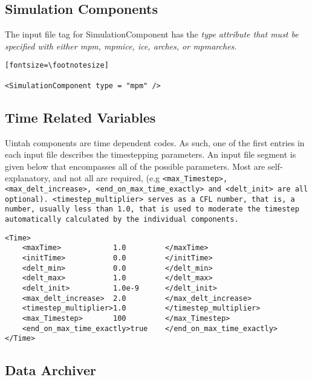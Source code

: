 \subsection{Simulation Components} \label{Sec:SimulationComponent}

The input file tag for SimulationComponent has the \em{type} attribute
that must be specified with either mpm, mpmice, ice, arches, or
mpmarches.  

\begin{verbatim}[fontsize=\footnotesize]

<SimulationComponent type = "mpm" />

\end{verbatim}



\subsection{Time Related Variables} \label{Sec:TimeRelatedVariables}
Uintah components are time dependent codes.  As such, one of the first
entries in each input file describes the timestepping parameters.  An
input file segment is given below that encompasses all of the possible
parameters.  Most are self-explanatory, and not all are required, (e.g
\tt <max\_Timestep>, <max\_delt\_increase>,
<end\_on\_max\_time\_exactly> \normalfont and \tt <delt\_init>
\normalfont are all optional).  \tt <timestep\_multiplier> \normalfont
serves as a CFL number, that is, a number, usually less than 1.0, that
is used to moderate the timestep automatically calculated by the
individual components.

\begin{Verbatim}[fontsize=\footnotesize]
<Time>
    <maxTime>            1.0         </maxTime>
    <initTime>           0.0         </initTime>
    <delt_min>           0.0         </delt_min>
    <delt_max>           1.0         </delt_max>
    <delt_init>          1.0e-9      </delt_init>
    <max_delt_increase>  2.0         </max_delt_increase>
    <timestep_multiplier>1.0         </timestep_multiplier>
    <max_Timestep>       100         </max_Timestep>
    <end_on_max_time_exactly>true    </end_on_max_time_exactly>
</Time>
\end{Verbatim}
%
\subsection{Data Archiver} \label{Sec:DataArchiver}


